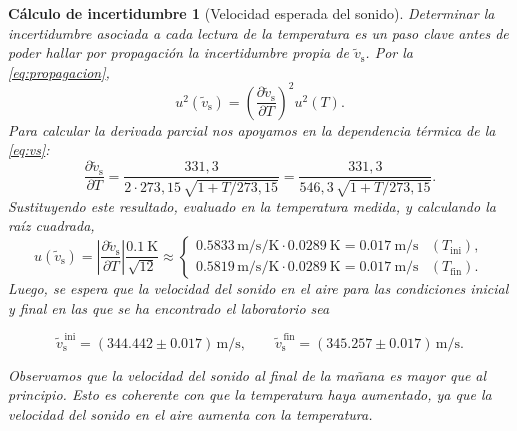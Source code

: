\documentclass[a4paper,11pt]{amsart}
\numberwithin{equation}{section}
\newcommand{\vst}{\tilde{v}_{\mathrm{s}}}     %
\theoremstyle{cienplano}
\theoremstyle{ciendef}
\newtheorem{calculo}[proposicion]{Cálculo de incertidumbre}
\theoremstyle{cienobs}
\begin{document}
\begin{calculo}[Velocidad esperada del sonido]\label{calc:vs}
Determinar la incertidumbre asociada a cada lectura de la temperatura es un paso
clave antes de poder hallar por propagación la incertidumbre propia de $\vst$.
Por la \cref{eq:propagacion},
\begin{equation*}
  u^{2}(\vst)=\left(\frac{\partial\vst}{\partial T}\right)^{\!2}u^{2}(T).
\end{equation*}
Para calcular la derivada parcial nos apoyamos en la dependencia térmica de
la \cref{eq:vs}:
\begin{equation}\label{eq:dvsdT}
  \frac{\partial\vst}{\partial T}
  =\frac{331{,}3}{2\cdot273{,}15\,\sqrt{1+T/273{,}15}}
  =\frac{331{,}3}{546{,}3\,\sqrt{1+T/273{,}15}}.
\end{equation}
Sustituyendo este resultado, evaluado en la temperatura medida, y calculando
la raíz cuadrada,
\begin{equation}\label{eq:uvs}
  u(\vst)=\left|\frac{\partial\vst}{\partial T}\right|\frac{\SI{0,1}{\kelvin}}{\sqrt{12}}
  \approx
  \begin{cases}
    \num{0,5833}\,\si{\meter\per\second\per\kelvin}\cdot\SI{0,0289}{\kelvin}=\SI{0,017}{\meter\per\second} & (T_{\mathrm{ini}}),\\[2pt]
    \num{0,5819}\,\si{\meter\per\second\per\kelvin}\cdot\SI{0,0289}{\kelvin}=\SI{0,017}{\meter\per\second} & (T_{\mathrm{fin}}).
  \end{cases}
\end{equation}
Luego, se espera que la velocidad del sonido en el aire para las condiciones inicial y final
en las que se ha encontrado el laboratorio sea
\begin{destacado}
\vspace{-6pt}
\begin{equation*}
  \vst^{\,\mathrm{ini}}=(\num{344,442}\pm\num{0,017})\,\si{\meter\per\second},
  \qquad
  \vst^{\,\mathrm{fin}}=(\num{345,257}\pm\num{0,017})\,\si{\meter\per\second}.
\end{equation*}
\end{destacado}
Observamos que la velocidad del sonido al final de la mañana es mayor que al principio. Esto es coherente con que la temperatura haya aumentado, ya que la velocidad del sonido en el aire aumenta con la temperatura.


\end{calculo}
\end{document}

